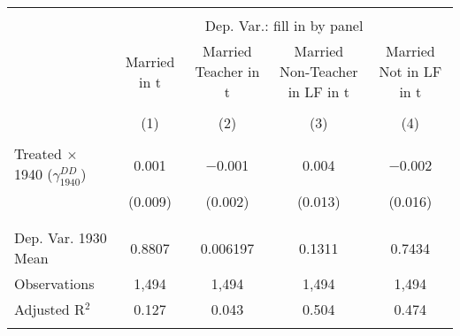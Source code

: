 
\begin{tabular}{@{\extracolsep{5pt}}lcccc} 
\\[-1.8ex]\hline 
\hline \\[-1.8ex] 
 & \multicolumn{4}{c}{Dep. Var.: fill in by panel} \\ 
\cline{2-5} 
 & Married in t & Married Teacher in t & Married Non-Teacher in LF in t & Married Not in LF in t \\ 
\\[-1.8ex] & (1) & (2) & (3) & (4)\\ 
\hline \\[-1.8ex] 
 Treated $\times$ 1940 ($\gamma_{1940}^{DD}$) & 0.001 & $-$0.001 & 0.004 & $-$0.002 \\ 
  & (0.009) & (0.002) & (0.013) & (0.016) \\ 
  & & & & \\ 
\hline \\[-1.8ex] 
Dep. Var. 1930 Mean & 0.8807 & 0.006197 & 0.1311 & 0.7434 \\ 
Observations & 1,494 & 1,494 & 1,494 & 1,494 \\ 
Adjusted R$^{2}$ & 0.127 & 0.043 & 0.504 & 0.474 \\ 
\hline 
\hline \\[-1.8ex] 
\end{tabular} 
